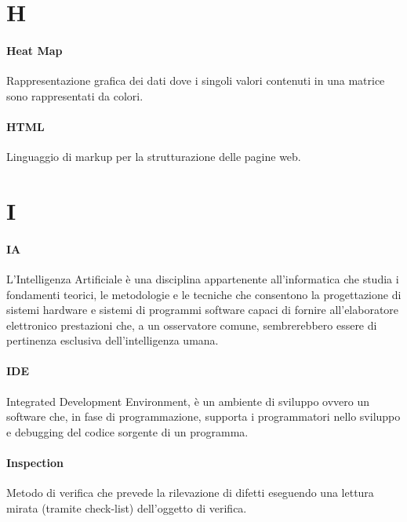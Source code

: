 \documentclass[]{article}
\begin{document}
	\newpage
	
	\section*{H}
	
	\paragraph*{Heat Map}
	Rappresentazione grafica dei dati dove i singoli valori contenuti in una matrice sono rappresentati da colori.
	
	\paragraph*{HTML}
	Linguaggio di markup per la strutturazione delle pagine web.
	
	\newpage
	
	\section*{I}
	
	\paragraph*{IA}
	L'Intelligenza Artificiale è una disciplina appartenente all'informatica che studia i fondamenti teorici, le metodologie e le tecniche che consentono la progettazione di sistemi hardware e sistemi di programmi software capaci di fornire all'elaboratore elettronico prestazioni che, a un osservatore comune, sembrerebbero essere di pertinenza esclusiva dell'intelligenza umana.
	
	\paragraph*{IDE}
	Integrated Development Environment, è un ambiente di sviluppo ovvero un software che, in fase di programmazione, supporta i programmatori nello sviluppo e debugging del codice sorgente di un programma.
	
	\paragraph*{Inspection}
	Metodo di verifica che prevede la rilevazione di difetti eseguendo una lettura mirata (tramite check-list) dell'oggetto di verifica.
	
\end{document}
